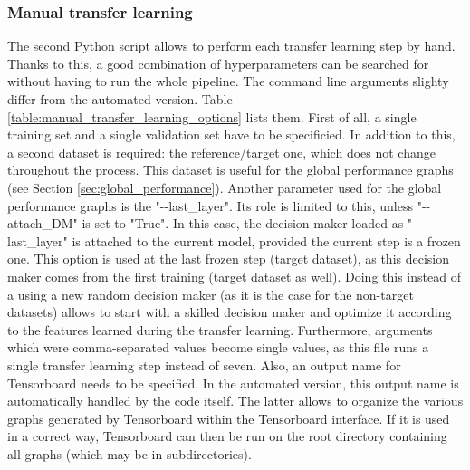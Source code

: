 \subsubsection{Manual transfer learning}
\setlength{\marginparwidth}{3cm}\leavevmode {}The second Python script allows to perform each transfer learning step by hand. Thanks to this, a good combination of hyperparameters can be searched for without having to run the whole pipeline. The command line arguments slighty differ from the automated version. Table \ref{table:manual_transfer_learning_options} lists them. First of all, a single training set and a single validation set have to be specificied. In addition to this, a second dataset is required: the reference/target one, which does not change throughout the process. This dataset is useful for the global performance graphs (see Section \ref{sec:global_performance}). Another parameter used for the global performance graphs is the "-{}-last{\_}layer". Its role is limited to this, unless "-{}-{}attach{\_}DM" is set to "True". In this case, the decision maker loaded as "-{}-last{\_}layer" is attached to the current model, provided the current step is a frozen one. This option is used at the last frozen step (target dataset), as this decision maker comes from the first training (target dataset as well). Doing this instead of a using a new random decision maker (as it is the case for the non-target datasets) allows to start with a skilled decision maker and optimize it according to the features learned during the transfer learning. Furthermore, arguments which were comma-separated values become single values, as this file runs a single transfer learning step instead of seven. Also, an output name for Tensorboard needs to be specified. In the automated version, this output name is automatically handled by the code itself. The latter allows to organize the various graphs generated by Tensorboard within the Tensorboard interface. If it is used in a correct way, Tensorboard can then be run on the root directory containing all graphs (which may be in subdirectories). 


